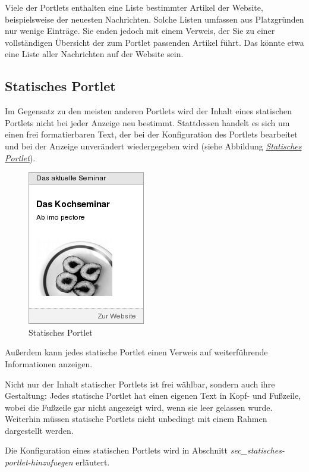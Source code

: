 \documentclass[a4paper,12pt,ngerman]{manual}
\begin{document}
Viele der Portlets enthalten eine Liste bestimmter Artikel der
Website, beispielsweise der neuesten Nachrichten. Solche Listen
umfassen aus Platzgründen nur wenige Einträge. Sie enden jedoch mit
einem Verweis, der Sie zu einer vollständigen Übersicht der zum
Portlet passenden Artikel führt. Das könnte etwa eine Liste aller
Nachrichten auf der Website sein.


\hypertarget{sec-statisches-portlet}{}\subsection{Statisches Portlet}

Im Gegensatz zu den meisten anderen Portlets wird der Inhalt eines statischen
Portlets nicht bei jeder Anzeige neu bestimmt. Stattdessen handelt es sich um
einen frei formatierbaren Text, der bei der Konfiguration des Portlets
bearbeitet und bei der Anzeige unverändert wiedergegeben wird (siehe
Abbildung \hyperlink{fig-statisches-portlet}{\emph{Statisches Portlet}}).
\hypertarget{fig-statisches-portlet}{}\begin{figure}[htbp]
\centering

\includegraphics{portlet-static.png}
\caption{Statisches Portlet}\end{figure}

Außerdem kann jedes statische Portlet einen Verweis auf weiterführende
Informationen anzeigen.

Nicht nur der Inhalt statischer Portlets ist frei wählbar, sondern auch ihre
Gestaltung: Jedes statische Portlet hat einen eigenen Text in Kopf- und
Fußzeile, wobei die Fußzeile gar nicht angezeigt wird, wenn sie leer gelassen
wurde. Weiterhin müssen statische Portlets nicht unbedingt mit einem Rahmen
dargestellt werden.

Die Konfiguration eines statischen Portlets wird in
Abschnitt \emph{sec\_statisches-portlet-hinzufuegen} erläutert.
\end{document}
